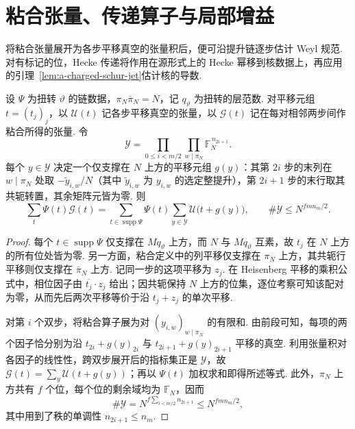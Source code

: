 \section{粘合张量、传递算子与局部增益}
\label{sec:a-local-divisibility}

将粘合张量展开为各步平移真空的张量积后，便可沿提升链逐步估计 Weyl 规范. 对有标记的位，Hecke 传递将作用在源形式上的 Hecke 幂移到核数据上，再应用的引理~\ref{lem:a-charged-schur-jet}估计核的导数.

\begin{lemma}[粘合张量的平移展开]
\label{lem:a-glued-translate-expansion}
\emitthmsource
设 $\Psi$ 为扭转 $\vartheta$ 的链数据，$\pi_N\bar\pi_N=N$，记 $q_\vartheta$ 为扭转的层范数. 对平移元组 $t=(t_j)_j$，以 $\mathcal U(t)$ 记各步平移真空的张量，以 $\mathcal G(t)$ 记在每对相邻两步间作粘合所得的张量. 令
\[
 \mathcal Y=\prod_{0\le i<m/2}\prod_{w\mid\pi_N}
                \mathbb F_N^{\,n_{2i+1}}.
\]
每个 $y\in\mathcal Y$ 决定一个仅支撑在 $N$ 上方的平移元组 $g(y)$：其第 $2i$ 步的末列在 $w\mid\pi_N$ 处取 $-\widetilde y_{i,w}/N$（其中 $\widetilde y_{i,w}$ 为 $y_{i,w}$ 的选定整提升），第 $2i+1$ 步的末行取其共轭转置，其余矩阵元皆为零. 则
\[
 \sum_t\Psi(t)\mathcal G(t)
  =\sum_{t\in\operatorname{supp}\Psi}\Psi(t)
     \sum_{y\in\mathcal Y}\mathcal U\bigl(t+g(y)\bigr),
 \qquad
 \#\mathcal Y\le N^{fmn_m/2}.
\]
\end{lemma}
\begin{proof}
每个 $t\in\operatorname{supp}\Psi$ 仅支撑在 $Mq_\vartheta$ 上方，而 $N$ 与 $Mq_\vartheta$ 互素，故 $t_j$ 在 $N$ 上方的所有位处皆为零. 另一方面，粘合定义中的列平移仅支撑在 $\pi_N$ 上方，其共轭行平移则仅支撑在 $\bar\pi_N$ 上方. 记同一步的这项平移为 $z_j$. 在 Heisenberg 平移的乘积公式中，相位因子由 $\overline{t_j}\cdot z_j$ 给出；因共轭保持 $N$ 上方的位集，逐位考察可知该配对为零，从而先后两次平移等价于沿 $t_j+z_j$ 的单次平移.

对第 $i$ 个双步，将粘合算子展为对 $(y_{i,w})_{w\mid\pi_N}$ 的有限和. 由前段可知，每项的两个因子恰分别为沿 $t_{2i}+g(y)_{2i}$ 与 $t_{2i+1}+g(y)_{2i+1}$ 平移的真空. 利用张量积对各因子的线性性，跨双步展开后的指标集正是 $\mathcal Y$，故 $\mathcal G(t)=\sum_y\mathcal U(t+g(y))$；再以 $\Psi(t)$ 加权求和即得所述等式. 此外，$\pi_N$ 上方共有 $f$ 个位，每个位的剩余域均为 $\mathbb F_N$，因而
\[
 \#\mathcal Y=N^{f\sum_{i<m/2}n_{2i+1}}
       \le N^{fmn_m/2},
\]
其中用到了秩的单调性 $n_{2i+1}\le n_m$.
\end{proof}

